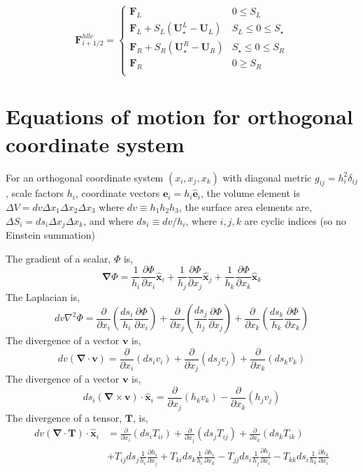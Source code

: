 \documentclass{article}
\newcommand{\pderiv}[1]{\frac{\partial }{\partial #1}}
\newcommand{\ppderiv}[2]{\frac{\partial #1}{\partial #2}}
\newcommand{\del}{\mathbf{\nabla}}
\begin{document}
\begin{equation}
\mathbf{F}_{i+1/2}^{hllc} = 
\begin{cases}
\mathbf{F}_L & 0 \le S_L \\
\mathbf{F}_L + S_L(\mathbf{U}_\star^L - \mathbf{U}_L) & S_L \le 0 \le S_\star \\
\mathbf{F}_R + S_R(\mathbf{U}_\star^R - \mathbf{U}_R) & S_\star \le 0 \le S_R \\
\mathbf{F}_R & 0 \ge S_R \\
\end{cases}
\end{equation}

\section{Equations of motion for orthogonal coordinate system}
For an orthogonal coordinate system $(x_i,x_j,x_k)$ with diagonal metric $g_{ij} = h_ i^2 \delta_{ij}$, scale factors $h_i$, coordinate vectors  $\mathbf{e}_i = h_i \hat{\mathbf{e}}_i $, the volume element is $\Delta V = dv \Delta x_1 \Delta x_2 \Delta x_3$ where $dv \equiv h_1 h_2 h_3$, the surface area elements are, $\Delta S_i = ds_i \Delta x_j \Delta x_k$, and where $ds_i \equiv dv / h_i$, where $i,j,k$ are cyclic indices (so no Einstein summation)

The gradient of a scalar, $\Phi$ is,
\begin{equation}
\del \Phi = \frac{1}{h_i} \ppderiv{\Phi}{x_i} \hat{\mathbf{x}}_i  + \frac{1}{h_j} \ppderiv{\Phi}{x_j} \hat{\mathbf{x}}_j + \frac{1}{h_k} \ppderiv{\Phi}{x_k} \hat{\mathbf{x}}_k 
\end{equation}
The Laplacian is,
\begin{equation}
dv \nabla^2 \Phi = \pderiv{x_i}\left( \frac{ds_i}{h_i} \ppderiv{\Phi}{x_i} \right) + \pderiv{x_j}\left( \frac{ds_j}{h_j} \ppderiv{\Phi}{x_j}\right)  + \pderiv{x_k}\left( \frac{ds_k}{h_k}\ppderiv{\Phi}{x_k}\right) 
\end{equation}
The divergence of a vector $\mathbf{v}$ is,
\begin{equation}
d v (\del \cdot \mathbf{v}) = \pderiv{x_i} \left( ds_i v_i \right) +\pderiv{x_j} \left( ds_j v_j \right) +\pderiv{x_k} \left( ds_k v_k \right)  
\end{equation}
The divergence of a vector $\mathbf{v}$ is,
\begin{equation}
ds_i \left(\del \times \mathbf{v} \right) \cdot \hat{\mathbf{x}}_i = \pderiv{x_j} \left( h_k v_k \right) - \pderiv{x_k} \left( h_j v_j \right)
\end{equation}
The divergence of a tensor, $\mathbf{T}$, is, 
\begin{align} 
d v \left(\del \cdot \mathbf{T} \right) \cdot \hat{\mathbf{x}}_i &= \pderiv{x_i} \left( ds_i T_{ii} \right)  +  \pderiv{x_j} \left( ds_j T_{ij} \right) +  \pderiv{x_k} \left( ds_k T_{ik} \right)  \nonumber \\
&+  T_{ij} ds_j  \frac{1}{h_i} \ppderiv{h_i}{x_j}+ T_{ki} ds_k \frac{1}{h_i} \ppderiv{h_i}{x_k} - T_{jj} ds_i \frac{1}{h_j} \ppderiv{h_j}{x_i} - T_{kk} ds_i \frac{1}{h_k} \ppderiv{h_k}{x_i}
\end{align}
\end{document}
